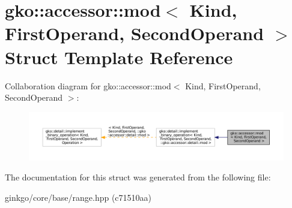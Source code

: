 \hypertarget{structgko_1_1accessor_1_1mod}{}\section{gko\+:\+:accessor\+:\+:mod$<$ Kind, First\+Operand, Second\+Operand $>$ Struct Template Reference}
\label{structgko_1_1accessor_1_1mod}


Collaboration diagram for gko\+:\+:accessor\+:\+:mod$<$ Kind, First\+Operand, Second\+Operand $>$\+:
\nopagebreak
\begin{figure}[H]
\begin{center}
\leavevmode
\includegraphics[width=350pt]{structgko_1_1accessor_1_1mod__coll__graph}
\end{center}
\end{figure}


The documentation for this struct was generated from the following file\+:\begin{DoxyCompactItemize}
\item 
ginkgo/core/base/range.\+hpp (c71510aa)\end{DoxyCompactItemize}
